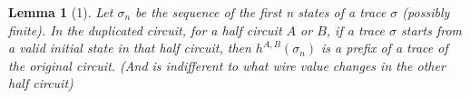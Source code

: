 \documentclass{article}
\newtheorem*{lemma}{Lemma}
\begin{document}
\begin{lemma}[1]
Let $\sigma_n$ be the sequence of the first n states of a trace $\sigma$ (possibly finite).  In the duplicated circuit, for a half circuit $A$ or $B$, if a trace $\sigma$ starts from a valid initial state in that half circuit, then $h^{A,B}(\sigma_n)$ is a prefix of a trace of the original circuit.  (And is indifferent to what wire value changes in the other half circuit)


\end{lemma}
\end{document}
